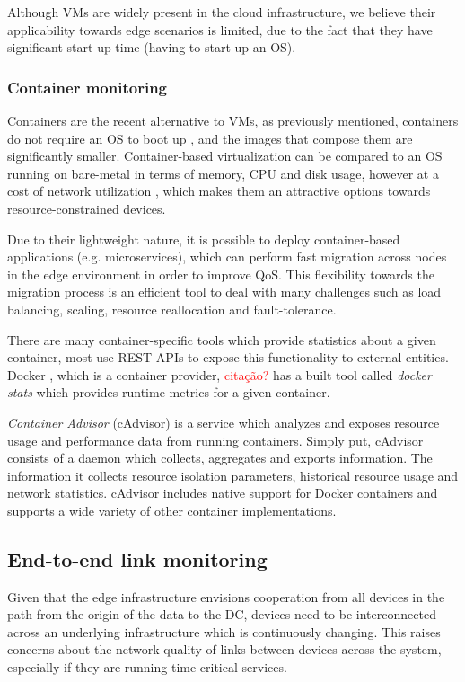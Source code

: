 Although VMs are widely present in the cloud infrastructure, we believe their applicability towards edge scenarios is limited, due to the fact that they have significant start up time (having to start-up an OS).  

\subsubsection{Container monitoring}

Containers are the recent alternative to VMs, as previously mentioned, containers do not require an OS to boot up \cite{}, and the images that compose them are significantly smaller. Container-based virtualization can be compared to an OS running on bare-metal in terms of memory, CPU and disk usage, however at a cost of network utilization \cite{preeth2015evaluation}, which makes them an attractive options towards resource-constrained devices.

Due to their lightweight nature, it is possible to deploy container-based applications (e.g. microservices), which can perform fast migration across nodes in the edge environment in order to improve QoS. This flexibility towards the migration process is an efficient tool to deal with many challenges such as load balancing, scaling, resource reallocation and fault-tolerance. 

There are many container-specific tools which provide statistics about a given container, most use REST APIs to expose this functionality to external entities. Docker \cite{docker}, which is a container provider, \textcolor{red}{citação?} has a built tool called \textit{docker stats} \cite{docker_stats} which provides runtime metrics for a given container.

\textit{Container Advisor} \cite{cAdvisor} (cAdvisor) is a service which analyzes and exposes resource usage and performance data from running containers. Simply put, cAdvisor consists of a daemon which collects, aggregates and exports information. The information it collects resource isolation parameters, historical resource usage and network statistics. cAdvisor includes native support for Docker containers and supports a wide variety of other container implementations.


\subsection{End-to-end link monitoring}

Given that the edge infrastructure envisions cooperation from all devices in the path from the origin of the data to the DC, devices need to be interconnected across an underlying infrastructure which is continuously changing. This raises concerns about the network quality of links between devices across the system, especially if they are running time-critical services. 

